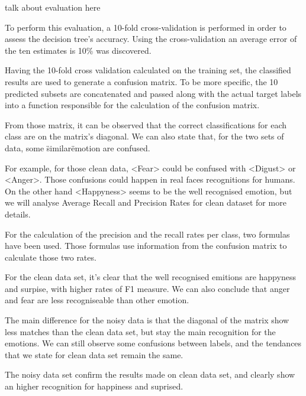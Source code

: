 

talk about evaluation here


To perform this evaluation, a 10-fold cross-validation is performed in order to assess the decision tree’s accuracy.
Using the cross-validation an average error of the ten estimates is 10\% was discovered.

Having the 10-fold cross validation calculated on the training set, the classified results
are used to generate a confusion matrix.
To be more specific, the 10 predicted subsets are concatenated
and passed along with the actual target labels into a function responsible for the calculation of the confusion matrix.

From those matrix, it can be observed that the correct classifications for each class are on the matrix’s diagonal.
We can also state that, for the two sets of data, some \"similar\" emotion are confused.



For example, for those clean data, <Fear> could be confused with <Digust> or <Anger>.
Those confusions could happen in real faces recognitions for humans.
On the other hand <Happyness> seems to be the well recognised emotion, but we will
analyse Average Recall and Precision Rates for clean dataset for more details. 




For the calculation of the precision and the recall rates per class, two formulas have been used.
Those formulas use information from the confusion matrix to calculate those two rates.

For the clean data set, it's clear that the well recognised emitions are happyness and surpise, with higher rates of F1 measure. 
We can also conclude that anger and fear are less recogniseable than other emotion.



The main difference for the noisy data is that the diagonal of the matrix show less matches than the clean data set, but stay the main recognition for the emotions.
We can still observe some confusions between labels, and the tendances that we state for clean data set remain the same.




The noisy data set confirm the results made on clean data set, and clearly show an higher recognition for happiness and suprised.
